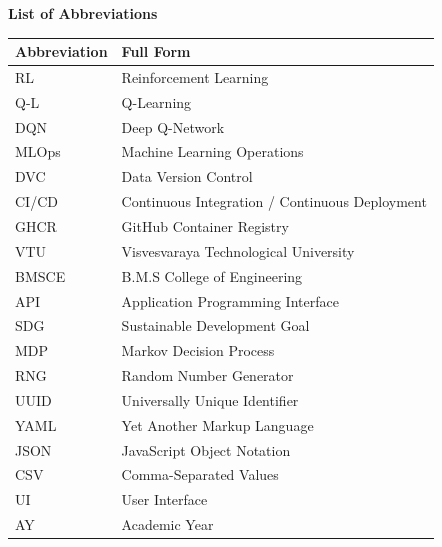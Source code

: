 \documentclass[12pt,a4paper]{report}
\begin{document}
\newpage
\tableofcontents

\newpage
\listoffigures

\newpage
\listoftables

\newpage
\begin{center}
  \textbf{\fontsize{14}{18}\selectfont List of Abbreviations}
\end{center}

\vspace{0.4cm}

\begin{tabular}{ll}
  \toprule
  \textbf{Abbreviation} & \textbf{Full Form} \\
  \midrule
  RL    & Reinforcement Learning \\
  Q-L   & Q-Learning \\
  DQN   & Deep Q-Network \\
  MLOps & Machine Learning Operations \\
  DVC   & Data Version Control \\
  CI/CD & Continuous Integration / Continuous Deployment \\
  GHCR  & GitHub Container Registry \\
  VTU   & Visvesvaraya Technological University \\
  BMSCE & B.M.S College of Engineering \\
  API   & Application Programming Interface \\
  SDG   & Sustainable Development Goal \\
  MDP   & Markov Decision Process \\
  RNG   & Random Number Generator \\
  UUID  & Universally Unique Identifier \\
  YAML  & Yet Another Markup Language \\
  JSON  & JavaScript Object Notation \\
  CSV   & Comma-Separated Values \\
  UI    & User Interface \\
  AY    & Academic Year \\
  \bottomrule
\end{tabular}
\end{document}
